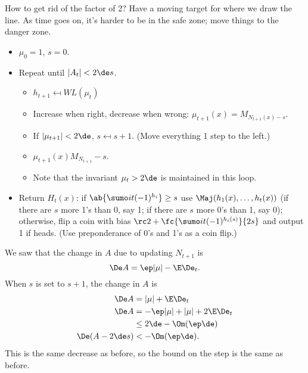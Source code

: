 How to get rid of the factor of 2? Have a moving target for where we draw the line. %
As time goes on, it's harder to be in the safe zone; move things to the danger zone.
\begin{alg}

\begin{itemize}
\item
$\mu_0=1$, $s=0$.
\item
Repeat until $|A_t|<2\de s$.
\begin{itemize}
\item
$h_{t+1}\mapsfrom WL(\mu_t)$
\item
Increase when right, decrease when wrong:
$\mu_{t+1}(x) = M_{N_{t+1}(x)-s}$.
\item
If $|\mu_{t+1}|<2\de$, $s\mapsfrom s+1$. (Move everything 1 step to the left.)
\item
$\mu_{t+1}(x) M_{N_{t+1}}-s$. %
\item
Note that the invariant $\mu_t>2\de$ is maintained in this loop.
\end{itemize}
\item
Return $H_t(x)$: if $\ab{\sumo it(-1)^{h_i}}\ge s$ 
use $\Maj(h_1(x),\ldots, h_t(x))$ (if there are $s$ more 1's than 0, say 1; if there are $s$ more 0's than 1, say 0); otherwise, flip a coin with bias $\rc 2+ \fc{\sumo it(-1)^{h_i(s)}}{2s}$ and output 1 if heads. (Use preponderance of 0's and 1's as a coin flip.)
\end{itemize}
\end{alg}

We saw that the change in $A$ due to updating $N_{t+1}$ is
$$
\De A = \ep |\mu|-\E\De_t.
$$
When $s$ is set to $s+1$, the change in $A$ is
\begin{align}
\De A &= |\mu| + \E \De_t\\
\De A &=  - \ep |\mu| + |\mu| + 2\E \De_t\\
&\le 2\de - \Om(\ep\de)\\
\De (A-2\de s) &<-\Om(\ep \de).
\end{align}
This is the same decrease as before, so the bound on the step is the same as before.

